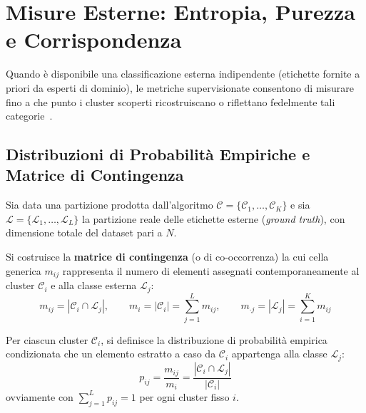 \FloatBarrier
\section{Misure Esterne: Entropia, Purezza e Corrispondenza}
\label{sec:dm-external-measures}

Quando è disponibile una classificazione esterna indipendente (etichette fornite a priori da esperti di dominio), le metriche supervisionate consentono di misurare fino a che punto i cluster scoperti ricostruiscano o riflettano fedelmente tali categorie~\cite{tan2018}.

\FloatBarrier
\subsection{Distribuzioni di Probabilità Empiriche e Matrice di Contingenza}
Sia data una partizione prodotta dall'algoritmo $\mathcal{C} = \{\mathcal{C}_1, \dots, \mathcal{C}_K\}$ e sia $\mathcal{L} = \{\mathcal{L}_1, \dots, \mathcal{L}_L\}$ la partizione reale delle etichette esterne (\textit{ground truth}), con dimensione totale del dataset pari a $N$.

Si costruisce la \textbf{matrice di contingenza} (o di co-occorrenza) la cui cella generica $m_{ij}$ rappresenta il numero di elementi assegnati contemporaneamente al cluster $\mathcal{C}_i$ e alla classe esterna $\mathcal{L}_j$:
\begin{equation}
\label{eq:dm-contingency-cell}
m_{ij} = |\mathcal{C}_i \cap \mathcal{L}_j|, \qquad m_i = |\mathcal{C}_i| = \sum_{j=1}^L m_{ij}, \qquad m_{\cdot j} = |\mathcal{L}_j| = \sum_{i=1}^K m_{ij}
\end{equation}

Per ciascun cluster $\mathcal{C}_i$, si definisce la distribuzione di probabilità empirica condizionata che un elemento estratto a caso da $\mathcal{C}_i$ appartenga alla classe $\mathcal{L}_j$:
\begin{equation}
\label{eq:dm-empirical-prob}
p_{ij} = \frac{m_{ij}}{m_i} = \frac{|\mathcal{C}_i \cap \mathcal{L}_j|}{|\mathcal{C}_i|}
\end{equation}
ovviamente con $\sum_{j=1}^L p_{ij} = 1$ per ogni cluster fisso $i$.

\FloatBarrier
